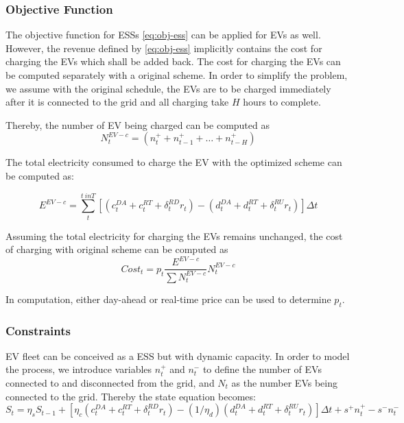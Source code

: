 \subsubsection{Objective Function}
The objective function for ESSs \ref{eq:obj-ess} can be applied for EVs as well. However, the revenue defined by \eqref{eq:obj-ess} implicitly contains the cost for charging the EVs which shall be added back. The cost for charging the EVs can be computed separately with a original scheme. In order to simplify the problem, we assume with the original schedule, the EVs are to be charged immediately after it is connected to the grid and all charging take $H$ hours to complete. 

Thereby, the number of EV being charged can be computed as
\begin{equation}
N_t^{EV-c} = (n_t^+ + n_{t-1}^+ + \dots + n_{t-H}^+)
\end{equation}

The total electricity consumed to charge the EV with the optimized scheme can be computed as:

\begin{equation}
E^{EV-c} = \sum_{t}^{t \ in T}[(c_t^{DA}+c_t^{RT}+\delta^{RD}_t r_t)  - (d_t^{DA}+d_t^{RT}+\delta^{RU}_t r_t)]\Delta t
\end{equation}

Assuming the total electricity for charging the EVs remains unchanged, the cost of charging with original scheme can be computed as
\begin{equation}
Cost_t = p_t \dfrac{E^{EV-c}}{\sum N_t^{EV-c} } N_t^{EV-c} 
\end{equation}

In computation, either day-ahead or real-time price can be used to determine $p_t$.
\subsubsection{Constraints}
EV fleet can be conceived as a ESS but with dynamic capacity. In order to model the process, we introduce variables $n_t^+$ and $n_t^-$ to define the number of EVs connected to and disconnected from the grid, and $N_t$ as the number EVs being connected to the grid. Thereby the state equation becomes:
\begin{equation}
\label{eq:state-EV}
S_t = \eta_s S_{t-1} + [\eta_c(c_t^{DA}+c_t^{RT}+\delta^{RD}_t r_t)  - (1/\eta_d)(d_t^{DA}+d_t^{RT}+\delta^{RU}_t r_t)]\Delta t + s^+ n_t^+ - s^- n_t^-
\end{equation}

